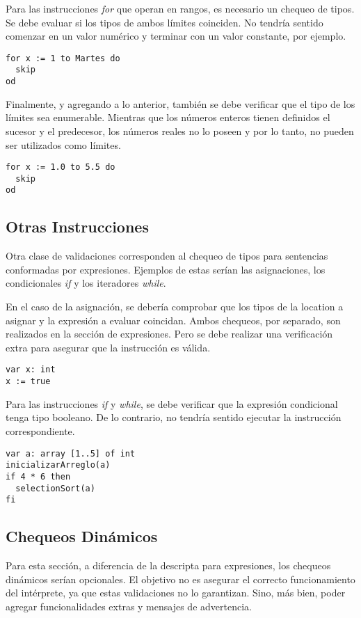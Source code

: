 \documentclass{article}
\begin{document}
Para las instrucciones \textit{for} que operan en rangos, es necesario un chequeo de tipos.
Se debe evaluar si los tipos de ambos límites coinciden.
No tendría sentido comenzar en un valor numérico y terminar con un valor constante, por ejemplo.
\begin{lstlisting}
for x := 1 to Martes do
  skip
od
\end{lstlisting}

Finalmente, y agregando a lo anterior, también se debe verificar que el tipo de los límites sea enumerable.
Mientras que los números enteros tienen definidos el sucesor y el predecesor, los números reales no lo poseen y por lo tanto, no pueden ser utilizados como límites.
\begin{lstlisting}
for x := 1.0 to 5.5 do
  skip
od
\end{lstlisting}

\subsection{Otras Instrucciones}

Otra clase de validaciones corresponden al chequeo de tipos para sentencias conformadas por expresiones.
Ejemplos de estas serían las asignaciones, los condicionales \textit{if} y los iteradores \textit{while}.

En el caso de la asignación, se debería comprobar que los tipos de la location a asignar y la expresión a evaluar coincidan.
Ambos chequeos, por separado, son realizados en la sección de expresiones.
Pero se debe realizar una verificación extra para asegurar que la instrucción es válida.
\begin{lstlisting}
var x: int
x := true
\end{lstlisting}

Para las instrucciones \textit{if} y \textit{while}, se debe verificar que la expresión condicional tenga tipo booleano.
De lo contrario, no tendría sentido ejecutar la instrucción correspondiente.
\begin{lstlisting}
var a: array [1..5] of int
inicializarArreglo(a)
if 4 * 6 then
  selectionSort(a)
fi
\end{lstlisting}

\subsection{Chequeos Dinámicos}

Para esta sección, a diferencia de la descripta para expresiones, los chequeos dinámicos serían opcionales.
El objetivo no es asegurar el correcto funcionamiento del intérprete, ya que estas validaciones no lo garantizan.
Sino, más bien, poder agregar funcionalidades extras y mensajes de advertencia.
\end{document}
